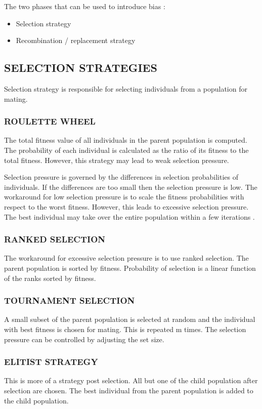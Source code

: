 \documentclass[12pt,a4paper]{article}
\begin{document}
	The two phases that can be used to introduce bias \cite{handbook}: 
	\begin{itemize}
	\item Selection strategy
	\item Recombination / replacement strategy
	\end{itemize}
	
	\subsection{SELECTION STRATEGIES} 
	Selection strategy is responsible for selecting individuals from a population for mating.
	\subsubsection{ROULETTE WHEEL}
	The total fitness value of all individuals in the parent population is computed. The probability of each individual is calculated as the ratio of its fitness to the total fitness. However, this strategy may lead to weak selection pressure. \par
	Selection pressure is governed by the differences in selection probabilities of individuals. If the differences are too small then the selection pressure is low.
	The workaround for low selection pressure is to scale the fitness probabilities with respect to the worst fitness. However, this leads to excessive selection pressure. The best individual may take over the entire population within a few iterations \cite{handbook}. \par
	
	\subsubsection{RANKED SELECTION}
	The workaround for excessive selection pressure is to use ranked selection. The parent population is sorted by fitness. Probability of selection is a linear function of the ranks sorted by fitness.
	
	\subsubsection{TOURNAMENT SELECTION}
	A small subset of the parent population is selected at random and the individual with best fitness is chosen for mating. This is repeated m times. The selection pressure can be controlled by adjusting the set size.
	
	\subsubsection{ELITIST STRATEGY}
	This is more of a strategy post selection. All but one of the child population after selection are chosen. The best individual from the parent population is added to the child population.
	
\end{document}
